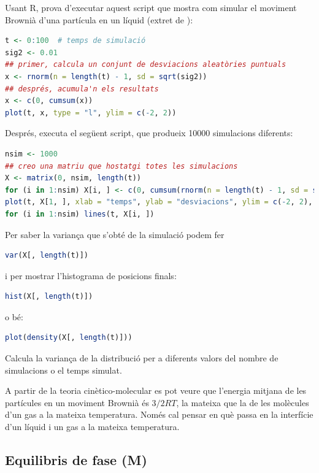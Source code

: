 \begin{exr}
Usant R, prova d'executar aquest script que mostra com simular el moviment Brownià d'una partícula en un líquid (extret de ):
\begin{lstlisting}[language=R]
t <- 0:100  # temps de simulació
sig2 <- 0.01
## primer, calcula un conjunt de desviacions aleatòries puntuals
x <- rnorm(n = length(t) - 1, sd = sqrt(sig2))
## després, acumula'n els resultats
x <- c(0, cumsum(x))
plot(t, x, type = "l", ylim = c(-2, 2))
\end{lstlisting}

Després, executa el següent script, que produeix 10000 simulacions diferents:

\begin{lstlisting}[language=R]
nsim <- 1000
## creo una matriu que hostatgi totes les simulacions
X <- matrix(0, nsim, length(t))
for (i in 1:nsim) X[i, ] <- c(0, cumsum(rnorm(n = length(t) - 1, sd = sqrt(sig2))))
plot(t, X[1, ], xlab = "temps", ylab = "desviacions", ylim = c(-2, 2), type = "l")
for (i in 1:nsim) lines(t, X[i, ])
\end{lstlisting}
\end{exr}
\begin{exr}
Per saber la variança que s'obté de la simulació podem fer
\begin{lstlisting}[language=R]
var(X[, length(t)])
\end{lstlisting}
i per mostrar l'histograma de posicions finals:
\begin{lstlisting}[language=R]
hist(X[, length(t)])
\end{lstlisting}
o bé:
\begin{lstlisting}[language=R]
plot(density(X[, length(t)]))
\end{lstlisting}
Calcula la variança de la distribució per a diferents valors del nombre de simulacions o el temps simulat.
\end{exr}

A partir de la teoria cinètico-molecular es pot veure que l'energia mitjana de les partícules en un moviment Brownià és $3/2 RT$, la mateixa que la de les molècules d'un gas a la mateixa temperatura. Només cal pensar en què passa en la interfície d'un líquid i un gas a la mateixa temperatura.


\subsection{Equilibris de fase (M)}

